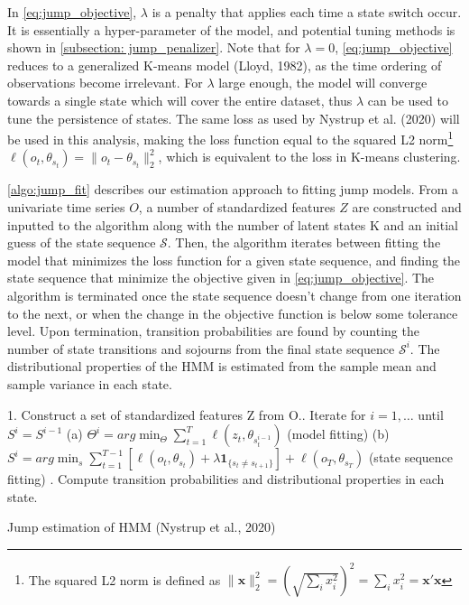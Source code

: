 In \cref{eq:jump_objective}, $\lambda$ is a penalty that applies each time a state switch occur. It is essentially a hyper-parameter of the model, and potential tuning methods is shown in \cref{subsection: jump_penalizer}. Note that for $\lambda=0$, \cref{eq:jump_objective} reduces to a generalized K-means model (Lloyd, 1982), as the time ordering of observations become irrelevant. For $\lambda$ large enough, the model will converge towards a single state which will cover the entire dataset, thus $\lambda$ can be used to tune the persistence of states. The same loss as used by Nystrup et al. (2020) will be used in this analysis, making the loss function equal to the squared L2 norm\footnote{The squared L2 norm is defined as $\|\mathbf{x}\|_2^2 = (\sqrt{\sum_i x_i^2})^2 = \sum_i x_i^2 = \mathbf{x'x} $} $\ell(o_t, \theta_{s_t}) = \| o_t - \theta_{s_t} \|_2^2$, which is equivalent to the loss in K-means clustering.

\cref{algo:jump_fit} describes our estimation approach to fitting jump models. From a univariate time series $O$, a number of standardized features $Z$ are constructed and inputted to the algorithm along with the number of latent states K and an initial guess of the state sequence $\mathcal{S}$. Then, the algorithm iterates between fitting the model that minimizes the loss function for a given state sequence, and finding the state sequence that minimize the objective given in \cref{eq:jump_objective}. The algorithm is terminated once the state sequence doesn't change from one iteration to the next, or when the change in the objective function is below some tolerance level. Upon termination, transition probabilities are found by counting the number of state transitions and sojourns from the final state sequence $\mathcal{S}^i$. The distributional properties of the HMM is estimated from the sample mean and sample variance in each state.

\begin{algorithm}[H]
\BlankLine

1. Construct a set of standardized features Z from O.. Iterate for $i=1,\ldots$ until $S^i=S^{i-1}$ \;
\Indp
(a) $\Theta^i = arg\min_{\Theta} \sum_{t=1}^T \ell(z_t, \theta_{s_t^{i-1}})$ (model fitting)\;
(b) $S^i = arg\min_s \sum_{t=1}^{T-1} [\ell(o_t, \theta_{s_t}) + \lambda\mathbf{1}_{\{ s_t\ne s_{t+1} \}}]
    + \ell(o_T, \theta_{s_T})$ (state sequence fitting)\;
. Compute transition probabilities and distributional properties in each state.\;
\BlankLine
{}

\caption{Jump estimation of HMM (Nystrup et al., 2020)}
\label{algo:jump_fit}
\end{algorithm}

